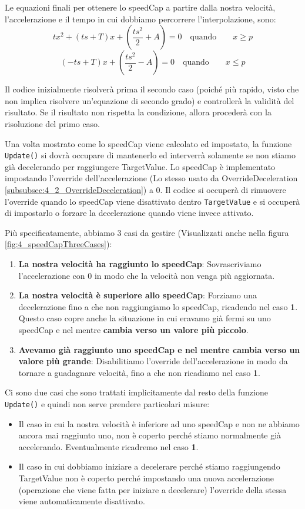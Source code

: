\documentclass[main.tex]{subfiles}
\begin{document}
Le equazioni finali per ottenere lo speedCap a partire dalla nostra velocità, l'accelerazione e il tempo in cui dobbiamo percorrere l'interpolazione, sono:
\[tx^2 + (ts + T)x + (\frac{ts^2}{2} + A) = 0 \quad\text{quando}\qquad x \geq p\]
\[(-ts + T)x + (\frac{ts^2}{2} - A) = 0 \quad\text{quando}\qquad x \leq p\]

Il codice inizialmente risolverà prima il secondo caso (poiché più rapido, visto che non implica risolvere un'equazione di secondo grado) e controllerà la validità del risultato. Se il risultato non rispetta la condizione, allora procederà con la risoluzione del primo caso. \newline

Una volta mostrato come lo speedCap viene calcolato ed impostato, la funzione \lstinline{Update()} si dovrà occupare di mantenerlo ed interverrà solamente se non stiamo già decelerando per raggiungere TargetValue. Lo speedCap è implementato impostando l'override dell'accelerazione (Lo stesso usato da OverrideDeceleration \ref{subsubsec:4_2_OverrideDeceleration}) a 0. Il codice si occuperà di rimuovere l'override quando lo speedCap viene disattivato dentro \lstinline{TargetValue} e si occuperà di impostarlo o forzare la decelerazione quando viene invece attivato.

\noindent Più specificatamente, abbiamo 3 casi da gestire (Visualizzati anche nella figura \ref{fig:4_speedCapThreeCases}):
\begin{enumerate}
    \item \textbf{La nostra velocità ha raggiunto lo speedCap}: Sovrascriviamo l'accelerazione con 0 in modo che la velocità non venga più aggiornata.
    \item \textbf{La nostra velocità è superiore allo speedCap}: Forziamo una decelerazione fino a che non raggiungiamo lo speedCap, ricadendo nel caso \textbf{1}. Questo caso copre anche la situazione in cui eravamo già fermi su uno speedCap e nel mentre \textbf{cambia verso un valore più piccolo}.
    \item \textbf{Avevamo già raggiunto uno speedCap e nel mentre cambia verso un valore più grande}: Disabilitiamo l'override dell'accelerazione in modo da tornare a guadagnare velocità, fino a che non ricadiamo nel caso \textbf{1}.
\end{enumerate}

Ci sono due casi che sono trattati implicitamente dal resto della funzione \lstinline{Update()} e quindi non serve prendere particolari misure:
\begin{itemize}
    \item Il caso in cui la nostra velocità è inferiore ad uno speedCap e non ne abbiamo ancora mai raggiunto uno, non è coperto perché stiamo normalmente già accelerando. Eventualmente ricadremo nel caso \textbf{1}.
    \item Il caso in cui dobbiamo iniziare a decelerare perché stiamo raggiungendo TargetValue non è coperto perché impostando una nuova accelerazione (operazione che viene fatta per iniziare a decelerare) l'override della stessa viene automaticamente disattivato.
\end{itemize}
\end{document}
